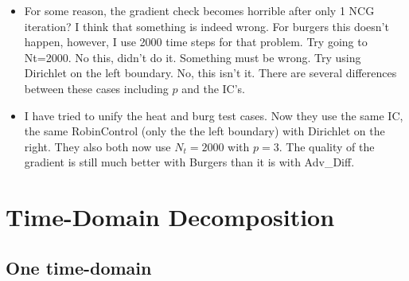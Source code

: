 \documentclass[12pt]{article}
\begin{document}
\begin{itemize}
\item For some reason, the gradient check becomes horrible after only 1 NCG
iteration?  I think that something is indeed wrong.  For burgers this doesn't
happen, however, I use 2000 time steps for that problem.  Try going to
Nt=2000.  No this, didn't do it.  Something must be wrong.  Try using
Dirichlet on the left boundary.  No, this isn't it.  There are several
differences between these cases including $p$ and the IC's.

\item I have tried to unify the heat and burg test cases.  Now they use the
same IC, the same RobinControl (only the the left boundary) with Dirichlet on
the right.  They also both now use $N_t=2000$ with $p=3$.  The quality of the
gradient is still much better with Burgers than it is with Adv\_Diff.
\end{itemize}


\section{Time-Domain Decomposition}

\subsection{One time-domain}
\end{document}
